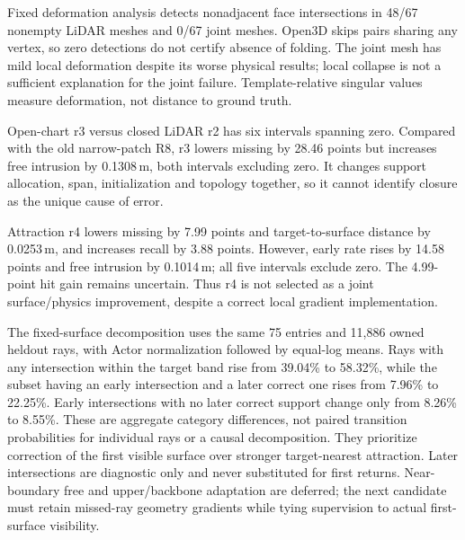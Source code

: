 \documentclass[10pt,a4paper]{article}
\begin{document}
Fixed deformation analysis detects nonadjacent face intersections in 48/67
nonempty LiDAR meshes and 0/67 joint meshes. Open3D skips pairs sharing any
vertex, so zero detections do not certify absence of folding. The joint mesh
has mild local deformation despite its worse physical results; local collapse
is not a sufficient explanation for the joint failure. Template-relative
singular values measure deformation, not distance to ground truth.

Open-chart r3 versus closed LiDAR r2 has six intervals spanning zero.
Compared with the old narrow-patch R8, r3 lowers missing by 28.46 points but
increases free intrusion by 0.1308\,m, both intervals excluding zero. It changes
support allocation, span, initialization and topology together, so it cannot
identify closure as the unique cause of error.

\begin{table}[htbp]
\centering\small

\caption{Completed ray-attraction r4 minus the same open-chart r3, all 75
development entries and five logs. Only the hit interval spans zero.
Improved coverage does not offset the increased early returns and intrusion.}
\label{tab:raypaired}
\end{table}

Attraction r4 lowers missing by 7.99 points and target-to-surface distance by
0.0253\,m, and increases recall by 3.88 points. However, early rate rises by
14.58 points and free intrusion by 0.1014\,m; all five intervals exclude zero.
The 4.99-point hit gain remains uncertain. Thus r4 is not selected as a joint
surface/physics improvement, despite a correct local gradient implementation.

The fixed-surface decomposition uses the same 75 entries and 11,886 owned
heldout rays, with Actor normalization followed by equal-log means. Rays with
any intersection within the target band rise from 39.04\% to 58.32\%, while
the subset having an early intersection and a later correct one rises from
7.96\% to 22.25\%. Early intersections with no later correct support change
only from 8.26\% to 8.55\%. These are aggregate category differences, not
paired transition probabilities for individual rays or a causal decomposition.
They prioritize correction of the first visible surface over stronger
target-nearest attraction. Later intersections are diagnostic only and never
substituted for first returns. Near-boundary free and upper/backbone adaptation
are deferred; the next candidate must retain missed-ray geometry gradients
while tying supervision to actual first-surface visibility.
\end{document}
